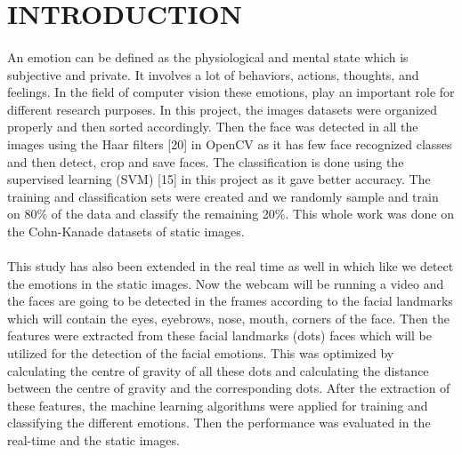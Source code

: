 \documentclass[a4paper,12pt,oneside]{article}
\begin{document}
\rfoot{\thepage}

\renewcommand{\headrulewidth}{0.0pt}
\renewcommand{\footrulewidth}{0.0pt}




\renewcommand{\headrulewidth}{0.0pt}
\renewcommand{\footrulewidth}{0.0pt}



\section{INTRODUCTION}
\paragraph{}
An emotion can be defined as the physiological and
mental state which is subjective and private. It involves
a lot of behaviors, actions, thoughts, and feelings. In the
field of computer vision these emotions, play an
important role for different research purposes. In this
project, the images datasets were organized properly and
then sorted accordingly. Then the face was detected in
all the images using the Haar filters [20] in OpenCV as
it has few face recognized classes and then detect, crop
and save faces. The classification is done using the
supervised learning (SVM) [15] in this project as it gave
better accuracy. The training and classification sets were
created and we randomly sample and train on 80\% of the
data and classify the remaining 20\%. This whole work
was done on the Cohn-Kanade datasets of static images.
\paragraph{}
This study has also been extended in the real time as well
in which like we detect the emotions in the static images.
Now the webcam will be running a video and the faces
are going to be detected in the frames according to the
facial landmarks which will contain the eyes, eyebrows,
nose, mouth, corners of the face. Then the features were
extracted from these facial landmarks (dots) faces which
will be utilized for the detection of the facial emotions. This was optimized by calculating the centre of
gravity of all these dots and calculating the distance
between the centre of gravity and the corresponding dots.
After the extraction of these features, the machine
learning algorithms were applied for training and
classifying the different emotions. Then the
performance was evaluated in the real-time and the static
images.
\end{document}
